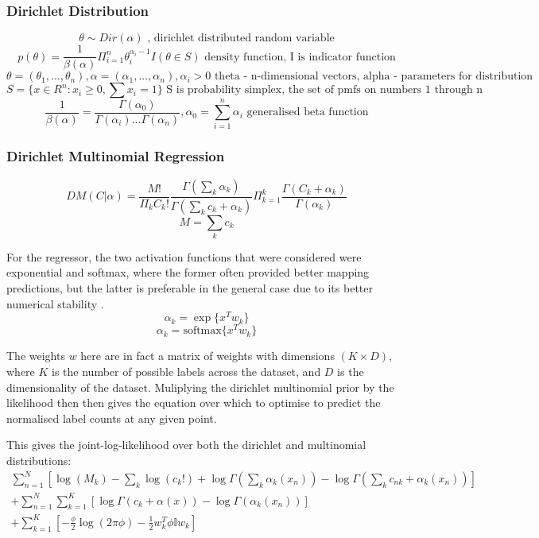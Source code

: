 \subsubsection{Dirichlet Distribution}

$$\theta \sim Dir(\alpha) \text{ , dirichlet distributed random variable}$$ 
$$p(\theta)= \frac{1}{\beta(\alpha)} \Pi_{i=1}^n \theta_i^{\alpha_i - 1} I(\theta \in S) \text{ density function, I is indicator function}$$ 
$$ \theta = (\theta_1, ..., \theta_n), \alpha = (\alpha_1,...,\alpha_n), \alpha_i > 0 \text{ theta - n-dimensional vectors, alpha - parameters for distribution}$$
$$ S = \{x \in R^n : x_i \geq 0, \sum x_i = 1\} \text{ S is probability simplex, the set of pmfs on numbers 1 through n}$$ 
$$\frac{1}{\beta(\alpha)} = \frac{\Gamma(\alpha_0)}{\Gamma(\alpha_i) ... \Gamma(\alpha_n)}, \alpha_0 = \sum_{i=1}^n \alpha_i \text{ generalised beta function}$$

\subsubsection{Dirichlet Multinomial Regression}


$$DM(C|\alpha) = \frac{M!}{\Pi_k C_k!} \frac{\Gamma(\sum_k \alpha_k)}{\Gamma(\sum_k c_k + \alpha_k)} \Pi_{k=1}^k \frac{\Gamma(C_k + \alpha_k)}{\Gamma(\alpha_k)}$$
$$ M = \sum_k c_k $$

For the regressor, the two activation functions that were considered were exponential and softmax, where the former often provided better mapping predictions, but the latter is preferable in the general case due to its better numerical stability .
$$\alpha_k = \exp\{x^T w_k\}$$
$$\alpha_k = \text{softmax}\{x^T w_k\}$$

The weights $w$ here are in fact a matrix of weights with dimensions $(K \times D)$, where $K$ is the number of possible labels across the dataset, and $D$ is the dimensionality of the dataset. Muliplying the dirichlet multinomial prior by the likelihood then then gives the equation over which to optimise to predict the normalised label counts at any given point.

This gives the joint-log-likelihood over both the dirichlet and multinomial distributions:
\begin{multline}
    \sum^N_{n=1} [\log(M_k) - \sum_k \log(c_k!) + \log \Gamma(\sum_k \alpha_k(x_n)) - \log \Gamma(\sum_k c_{nk} + \alpha_k(x_n))] \\
    + \sum^N_{n=1} \sum^K_{k=1} [\log \Gamma(c_k + \alpha(x)) - \log \Gamma(\alpha_k(x_n))] \\
    + \sum^K_{k=1} [-\frac{\phi}{2} \log(2\pi \phi) - \frac{1}{2}w_k^T \phi \mathbb{I} w_k]
\end{multline}

